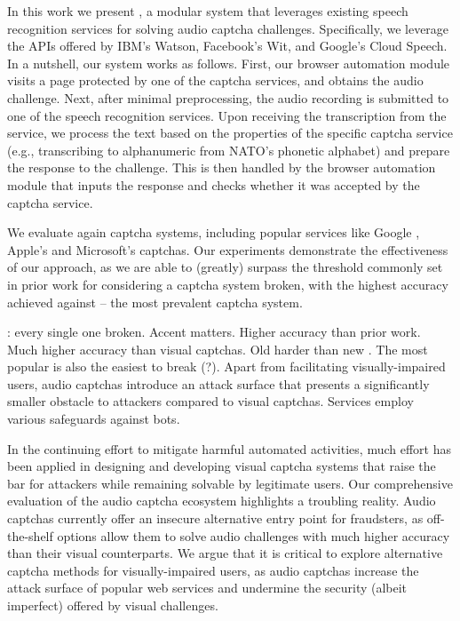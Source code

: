 In this work we present \system, a modular system that leverages existing speech recognition services
for solving audio captcha challenges. Specifically, we leverage the
APIs offered by IBM's Watson, Facebook's Wit, and Google's Cloud Speech. In a nutshell, our system works as
follows. First, our browser automation module visits a page protected by one of the captcha services,
and obtains the audio challenge. Next, after minimal preprocessing, the audio recording is submitted 
to one of the speech recognition services. Upon receiving the transcription from the service, we 
process the text based on the properties of the specific captcha service (e.g., transcribing to alphanumeric 
from NATO's phonetic alphabet) and prepare the response to the challenge. This is then handled by
the browser automation module that inputs the response and checks whether it was accepted by the captcha
service.

We evaluate \system again \no captcha systems, including popular services like Google \re,
Apple's and Microsoft's captchas. Our experiments demonstrate the effectiveness of our approach,
as we are able to (greatly) surpass the threshold commonly set in prior work for considering
a captcha system broken, with the highest accuracy achieved against \re -- the most prevalent 
captcha system.

: every single one broken. Accent matters. Higher accuracy than prior work. Much higher accuracy than
visual captchas. Old \re harder than new \re. The most popular is also the easiest to break (?).
Apart from facilitating visually-impaired users, audio captchas introduce an attack
surface that presents a significantly smaller obstacle to attackers compared to visual captchas.
Services employ various safeguards against bots.

In the continuing effort to mitigate harmful automated activities, much effort has been applied in 
designing and developing visual captcha systems that raise the bar for attackers while remaining 
solvable by legitimate users. Our comprehensive evaluation of the audio captcha ecosystem highlights
a troubling reality. Audio captchas currently offer an insecure alternative entry point for fraudsters,
as off-the-shelf options allow them to solve audio challenges with much higher accuracy than their visual
counterparts. We argue that it is critical to explore alternative captcha methods for visually-impaired users,
as audio captchas increase the attack surface of popular web services and undermine the security
(albeit imperfect) offered by visual challenges.


